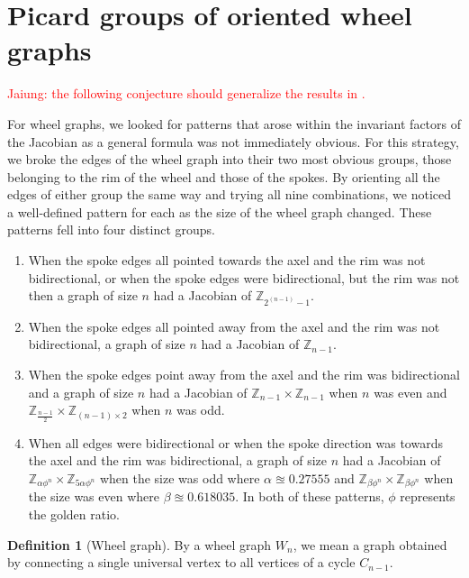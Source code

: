\documentclass[11pt,reqno]{amsart}
\theoremstyle{definition}
\newtheorem{mydef}{Definition}[section]
\theoremstyle{plain}
\begin{document}
\section{Picard groups of oriented wheel graphs}

\textcolor{red}{Jaiung: the following conjecture should generalize the results in \cite{biggs1999chip}.}


	For wheel graphs, we looked for patterns that arose within the invariant factors of the Jacobian as a
	general formula was not immediately obvious.  For this strategy, we broke the edges of the wheel graph into their
	two most obvious groups, those belonging to the rim of the wheel and those of the spokes.  By orienting all the
	edges of either group the same way and trying all nine combinations, we noticed a well-defined pattern for each as
	the size of the wheel graph changed.  These patterns fell into four distinct groups.

		\begin{enumerate}
			\item When the spoke edges all pointed towards the axel and the rim was not bidirectional, or when
				the spoke edges were bidirectional, but the rim was not then a graph of size $n$ had a
				Jacobian of $\mathbb{Z}_{2^{(n-1)}-1}$.
			\item When the spoke edges all pointed away from the axel and the rim was not bidirectional,
				a graph of size $n$ had a Jacobian of $\mathbb{Z}_{n-1}$.
			\item When the spoke edges point away from the axel and the rim was bidirectional and a graph of size
				$n$ had a Jacobian of $\mathbb{Z}_{n-1} \times \mathbb{Z}_{n-1}$ when $n$ was even
				and $\mathbb{Z}_{\frac{n-1}{2}} \times \mathbb{Z}_{(n-1) \times 2}$ when $n$ was odd.
			\item When all edges were bidirectional or when the spoke direction was towards the axel and
				the rim was bidirectional, a graph of size $n$ had a Jacobian of
				$\mathbb{Z}_{\alpha\phi^{n}} \times \mathbb{Z}_{5\alpha\phi^{n}}$ when the size
				was odd where $\alpha \approxeq 0.27555$ and $\mathbb{Z}_{\beta\phi^{n}} \times \mathbb{Z}_{\beta\phi^{n}}$
				when the size was even where $\beta \approxeq 0.618035$. In both of these patterns,
				$\phi$ represents the golden ratio.
		\end{enumerate}

\begin{mydef}[{Wheel graph}]
By a wheel graph $W_n$, we mean a graph obtained by connecting a single universal vertex to all vertices of a cycle $C_{n-1}$. 
\end{mydef}
\end{document}
